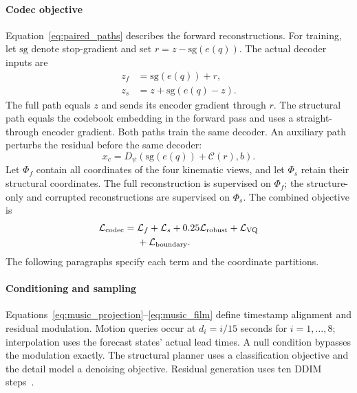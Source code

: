 \paragraph{Codec objective}
Equation~\eqref{eq:paired_paths} describes the forward reconstructions. For
training, let $\mathrm{sg}$ denote stop-gradient and set
$r=z-\mathrm{sg}(e(q))$. The actual decoder inputs are
\begin{align}
 z_f&=\mathrm{sg}(e(q))+r,\\
 z_s&=z+\mathrm{sg}(e(q)-z).
\label{eq:paired_gradients}
\end{align}
The full path equals $z$ and sends its encoder gradient through $r$. The
structural path equals the codebook embedding in the forward pass and uses a
straight-through encoder gradient. Both paths train the same decoder.
An auxiliary path perturbs the residual before the same decoder:
\begin{equation}
x_c=D_\psi\!\left(\mathrm{sg}(e(q))+\mathcal C(r),b\right).
\end{equation}
Let $\Phi_f$ contain all coordinates of the four kinematic views, and let
$\Phi_s$ retain their structural coordinates. The full reconstruction is
supervised on $\Phi_f$; the structure-only and corrupted reconstructions are
supervised on $\Phi_s$. The combined objective is
\begin{equation}
\begin{split}
\mathcal L_{\rm codec}={}&\mathcal L_f+\mathcal L_s
 +0.25\mathcal L_{\rm robust}+\mathcal L_{\rm VQ}\\
 &+\mathcal L_{\rm boundary}.
\end{split}
\label{eq:codec}
\end{equation}
The following paragraphs specify each term and the coordinate partitions.

\paragraph{Conditioning and sampling}
Equations~\eqref{eq:music_projection}--\eqref{eq:music_film}
define timestamp alignment and residual modulation. Motion queries occur at
$d_i=i/15$ seconds for $i=1,\ldots,8$; interpolation uses the forecast states'
actual lead times. A null condition bypasses the modulation exactly.
The structural planner uses a classification objective and the detail model
a denoising objective. Residual generation uses ten DDIM
steps~\cite{song2021ddim}.

